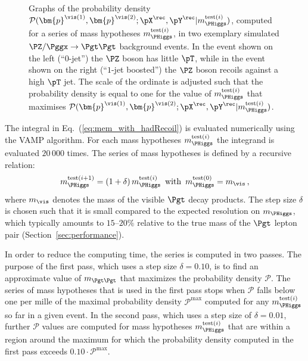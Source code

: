 \begin{figure}
\begin{center}
\end{center}
\caption{
  Graphs of the probability density $\mathcal{P}(\bm{p}^{\vis(1)},\bm{p}^{\vis(2)};\pX^{\rec},\pY^{\rec}|m_{\PHiggs}^{\textrm{test}(i)})$, 
  computed for a series of mass hypotheses $m_{\PHiggs}^{\textrm{test}(i)}$, in two exemplary simulated $\PZ/\Pggx \to \Pgt\Pgt$ background events.
  In the event shown on the left (``$0$-jet'') the $\PZ$ boson has little $\pT$, while in the event shown on the right (``$1$-jet boosted'') the $\PZ$ boson recoils against a high $\pT$ jet.
  The scale of the ordinate is adjusted such that the probability density is equal to one
  for the value of $m_{\PHiggs}^{\textrm{test}(i)}$ that maximises $\mathcal{P}(\bm{p}^{\vis(1)},\bm{p}^{\vis(2)};\pX^{\rec},\pY^{\rec}|m_{\PHiggs}^{\textrm{test}(i)})$.
}
\label{fig:likelihoodGraphs}
\end{figure}

The integral in Eq.~(\ref{eq:mem_with_hadRecoil}) is evaluated numerically using the VAMP algorithm.
For each mass hypotheses $m_{\PHiggs}^{\textrm{test}(i)}$ the integrand is evaluated $20\,000$ times.
The series of mass hypotheses is defined by a recursive relation: 
\begin{equation}
m_{\PHiggs}^{\textrm{test}(i + 1)} = (1 + \delta) \,  m_{\PHiggs}^{\textrm{test}(i)} \, \mbox{ with } \, m_{\PHiggs}^{\textrm{test}(0)} = m_{\vis} \, ,
\label{eq:mTauTau_step_size}
\end{equation}
where $m_{\vis}$ denotes the mass of the visible $\Pgt$ decay products.
The step size $\delta$ is chosen such that it is small compared to the
expected resolution on $m_{\PHiggs}$,
which typically amounts to $15$--$20\%$ relative to the true mass of the $\Pgt$ lepton pair (\cf Section~\ref{sec:performance}).

In order to reduce the computing time, the series is computed in two passes.
The purpose of the first pass, which uses a step size $\delta = 0.10$, is to find an approximate value of $m_{\Pgt\Pgt}$
that maximizes the probability density $\mathcal{P}$.
The series of mass hypotheses that is used in the first pass stops when $\mathcal{P}$ falls below one per mille 
of the maximal probability density $\mathcal{P}^{\textrm{max}}$
computed for any $m_{\PHiggs}^{\textrm{test}(i)}$ so far in a given event.
In the second pass, which uses a step size of $\delta = 0.01$,
further $\mathcal{P}$ values 
are computed for mass hypotheses $m_{\PHiggs}^{\textrm{test}(i)}$ that
are within a region around the maximum
for which the probability density computed in the first pass exceeds
$0.10 \cdot \mathcal{P}^{\textrm{max}}$.

